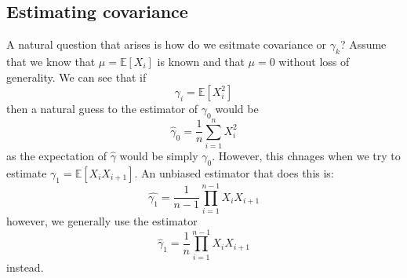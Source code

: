 \documentclass[12pt]{article}
\newcommand{\E}{\mathbb{E}}
\begin{document}
\subsection{Estimating covariance}
A natural question that arises is how do we esitmate covariance or $\gamma_k$? Assume that we know that $\mu = \E[X_i]$ is known and that $\mu = 0$ without loss of generality. We can see that if 
\[
	\gamma_i = \E[X_i^2] 
\]
then a natural guess to the estimator of $\gamma_0$ would be 
\[
	\hat{\gamma}_0 = \frac{1}{n}\sum_{i=1}^n X_i^2 
\]
as the expectation of $\hat{\gamma}$ would be simply $\gamma_0$. However, this chnages when we try to estimate $\gamma_1 = \E[X_i X_{i+1}]$. An unbiased estimator that does this is:
\[
	\hat{\gamma_1} = \frac{1}{n-1} \prod_{i = 1}^{n-1} X_i X_{i+1}
\]
however, we generally use the estimator 
\[
	\hat{\gamma}_1 = \frac{1}{n} \prod_{i=1}^{n-1} X_iX_{i+1}
\]
instead. 
\end{document}
